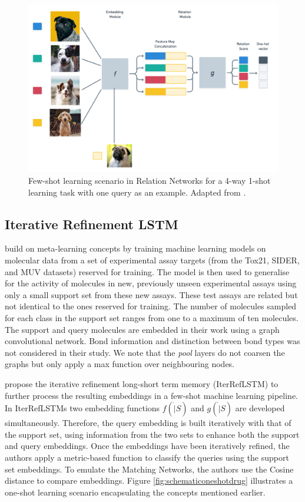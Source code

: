 \begin{figure}[h]
    \centering
    \includegraphics[width=0.9\linewidth]{img/RelationNetAdapt.png}
    \caption[Relation Networks]{Few-shot learning scenario in Relation Networks for a 4-way 1-shot learning task with one query as an example. Adapted from \citet{sung2018learning}.}
    \label{fig:relationnets}
\end{figure}

\subsection{Iterative Refinement LSTM}

\citet{altae2017low} build on meta-learning concepts by training machine learning models on molecular data from a set of experimental assay targets (from the Tox21, SIDER, and MUV datasets) reserved for training. The model is then used to generalise for the activity of molecules in new, previously unseen experimental assays using only a small support set from these new assays. These test assays are related but not identical to the ones reserved for training. The number of molecules sampled for each class in the support set ranges from one to a maximum of ten molecules. The support and query molecules are embedded in their work using a graph convolutional network. Bond information and distinction between bond types was not considered in their study. We note that the \textit{pool} layers do not coarsen the graphs but only apply a max function over neighbouring nodes.

\citet{altae2017low} propose the iterative refinement long-short term memory (IterRefLSTM) to further process the resulting embeddings in a few-shot machine learning pipeline. In IterRefLSTMs two embedding functions $f(\dot|S)$ and $g(\dot|S)$ are developed simultaneously. Therefore, the query embedding is built iteratively with that of the support set, using information from the two sets to enhance both the support and query embeddings. Once the embeddings have been iteratively refined, the authors apply a metric-based function to classify the queries using the support set embeddings. To emulate the Matching Networks, the authors use the Cosine distance to compare embeddings. Figure \ref{fig:schematiconeshotdrug} illustrates a one-shot learning scenario encapsulating the concepts mentioned earlier.

